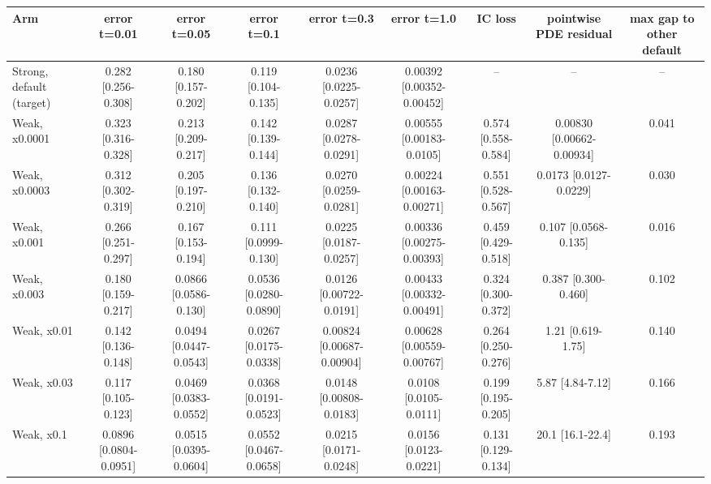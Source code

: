 \begin{tabular}{lcccccccc}
\toprule
Arm & error t=0.01 & error t=0.05 & error t=0.1 & error t=0.3 & error t=1.0 & IC loss & pointwise PDE residual & max gap to other default \\
\midrule
Strong, default (target) & 0.282 {\scriptsize[0.256-0.308]} & 0.180 {\scriptsize[0.157-0.202]} & 0.119 {\scriptsize[0.104-0.135]} & 0.0236 {\scriptsize[0.0225-0.0257]} & 0.00392 {\scriptsize[0.00352-0.00452]} & -- & -- & -- \\
Weak, x0.0001 & 0.323 {\scriptsize[0.316-0.328]} & 0.213 {\scriptsize[0.209-0.217]} & 0.142 {\scriptsize[0.139-0.144]} & 0.0287 {\scriptsize[0.0278-0.0291]} & 0.00555 {\scriptsize[0.00183-0.0105]} & 0.574 {\scriptsize[0.558-0.584]} & 0.00830 {\scriptsize[0.00662-0.00934]} & 0.041 \\
Weak, x0.0003 & 0.312 {\scriptsize[0.302-0.319]} & 0.205 {\scriptsize[0.197-0.210]} & 0.136 {\scriptsize[0.132-0.140]} & 0.0270 {\scriptsize[0.0259-0.0281]} & 0.00224 {\scriptsize[0.00163-0.00271]} & 0.551 {\scriptsize[0.528-0.567]} & 0.0173 {\scriptsize[0.0127-0.0229]} & 0.030 \\
Weak, x0.001 & 0.266 {\scriptsize[0.251-0.297]} & 0.167 {\scriptsize[0.153-0.194]} & 0.111 {\scriptsize[0.0999-0.130]} & 0.0225 {\scriptsize[0.0187-0.0257]} & 0.00336 {\scriptsize[0.00275-0.00393]} & 0.459 {\scriptsize[0.429-0.518]} & 0.107 {\scriptsize[0.0568-0.135]} & 0.016 \\
Weak, x0.003 & 0.180 {\scriptsize[0.159-0.217]} & 0.0866 {\scriptsize[0.0586-0.130]} & 0.0536 {\scriptsize[0.0280-0.0890]} & 0.0126 {\scriptsize[0.00722-0.0191]} & 0.00433 {\scriptsize[0.00332-0.00491]} & 0.324 {\scriptsize[0.300-0.372]} & 0.387 {\scriptsize[0.300-0.460]} & 0.102 \\
Weak, x0.01 & 0.142 {\scriptsize[0.136-0.148]} & 0.0494 {\scriptsize[0.0447-0.0543]} & 0.0267 {\scriptsize[0.0175-0.0338]} & 0.00824 {\scriptsize[0.00687-0.00904]} & 0.00628 {\scriptsize[0.00559-0.00767]} & 0.264 {\scriptsize[0.250-0.276]} & 1.21 {\scriptsize[0.619-1.75]} & 0.140 \\
Weak, x0.03 & 0.117 {\scriptsize[0.105-0.123]} & 0.0469 {\scriptsize[0.0383-0.0552]} & 0.0368 {\scriptsize[0.0191-0.0523]} & 0.0148 {\scriptsize[0.00808-0.0183]} & 0.0108 {\scriptsize[0.0105-0.0111]} & 0.199 {\scriptsize[0.195-0.205]} & 5.87 {\scriptsize[4.84-7.12]} & 0.166 \\
Weak, x0.1 & 0.0896 {\scriptsize[0.0804-0.0951]} & 0.0515 {\scriptsize[0.0395-0.0604]} & 0.0552 {\scriptsize[0.0467-0.0658]} & 0.0215 {\scriptsize[0.0171-0.0248]} & 0.0156 {\scriptsize[0.0123-0.0221]} & 0.131 {\scriptsize[0.129-0.134]} & 20.1 {\scriptsize[16.1-22.4]} & 0.193 \\

\end{tabular}
